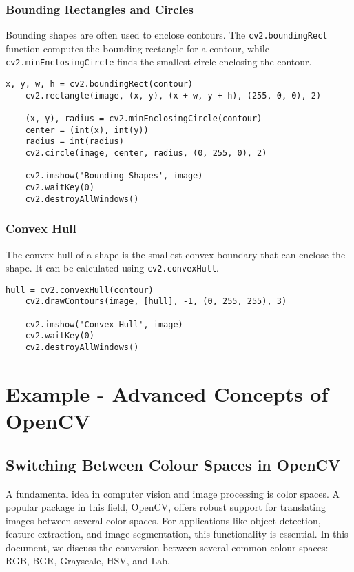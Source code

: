 \subsubsection{Bounding Rectangles and Circles}
Bounding shapes are often used to enclose contours. The \texttt{cv2.boundingRect} function computes the bounding rectangle for a contour, while \texttt{cv2.minEnclosingCircle} finds the smallest circle enclosing the contour.

\begin{lstlisting}[caption=Bounding Rectangles and Circles]
	x, y, w, h = cv2.boundingRect(contour)
	cv2.rectangle(image, (x, y), (x + w, y + h), (255, 0, 0), 2)
	
	(x, y), radius = cv2.minEnclosingCircle(contour)
	center = (int(x), int(y))
	radius = int(radius)
	cv2.circle(image, center, radius, (0, 255, 0), 2)
	
	cv2.imshow('Bounding Shapes', image)
	cv2.waitKey(0)
	cv2.destroyAllWindows()
\end{lstlisting}

\subsubsection{Convex Hull}
The convex hull of a shape is the smallest convex boundary that can enclose the shape. It can be calculated using \texttt{cv2.convexHull}.\cite{OpenCVTeam:2024}

\begin{lstlisting}[caption=Convex Hull]
	hull = cv2.convexHull(contour)
	cv2.drawContours(image, [hull], -1, (0, 255, 255), 3)
	
	cv2.imshow('Convex Hull', image)
	cv2.waitKey(0)
	cv2.destroyAllWindows()
\end{lstlisting}

\section{Example - Advanced Concepts of OpenCV}

\subsection{Switching Between Colour Spaces in OpenCV}

A fundamental idea in computer vision and image processing is color spaces. A popular package in this field, OpenCV, offers robust support for translating images between several color spaces. For applications like object detection, feature extraction, and image segmentation, this functionality is essential. In this document, we discuss the conversion between several common colour spaces: RGB, BGR, Grayscale, HSV, and Lab. 

